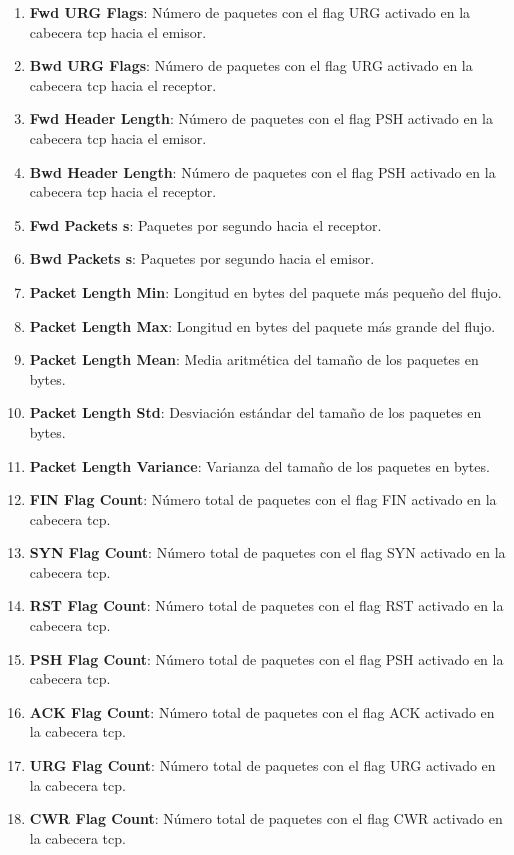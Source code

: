 \begin{enumerate}
    \item \textbf{Fwd URG Flags}: Número de paquetes con el flag URG activado en la cabecera \acrshort{tcp} hacia el emisor.
    \item \textbf{Bwd URG Flags}: Número de paquetes con el flag URG activado en la cabecera \acrshort{tcp} hacia el receptor.
    \item \textbf{Fwd Header Length}: Número de paquetes con el flag PSH activado en la cabecera \acrshort{tcp} hacia el emisor.
    \item \textbf{Bwd Header Length}: Número de paquetes con el flag PSH activado en la cabecera \acrshort{tcp} hacia el receptor.
    \item \textbf{Fwd Packets s}: Paquetes por segundo hacia el receptor.
    \item \textbf{Bwd Packets s}: Paquetes por segundo hacia el emisor.
    \item \textbf{Packet Length Min}: Longitud en bytes del paquete más pequeño del flujo.
    \item \textbf{Packet Length Max}: Longitud en bytes del paquete más grande del flujo.
    \item \textbf{Packet Length Mean}: Media aritmética del tamaño de los paquetes en bytes.
    \item \textbf{Packet Length Std}: Desviación estándar del tamaño de los paquetes en bytes.
    \item \textbf{Packet Length Variance}: Varianza del tamaño de los paquetes en bytes.
    \item \textbf{FIN Flag Count}: Número total de paquetes con el flag FIN activado en la cabecera \acrshort{tcp}.
    \item \textbf{SYN Flag Count}: Número total de paquetes con el flag SYN activado en la cabecera \acrshort{tcp}.
    \item \textbf{RST Flag Count}: Número total de paquetes con el flag RST activado en la cabecera \acrshort{tcp}.
    \item \textbf{PSH Flag Count}: Número total de paquetes con el flag PSH activado en la cabecera \acrshort{tcp}.
    \item \textbf{ACK Flag Count}: Número total de paquetes con el flag ACK activado en la cabecera \acrshort{tcp}.
    \item \textbf{URG Flag Count}: Número total de paquetes con el flag URG activado en la cabecera \acrshort{tcp}.
    \item \textbf{CWR Flag Count}: Número total de paquetes con el flag CWR activado en la cabecera \acrshort{tcp}.

\end{enumerate}
